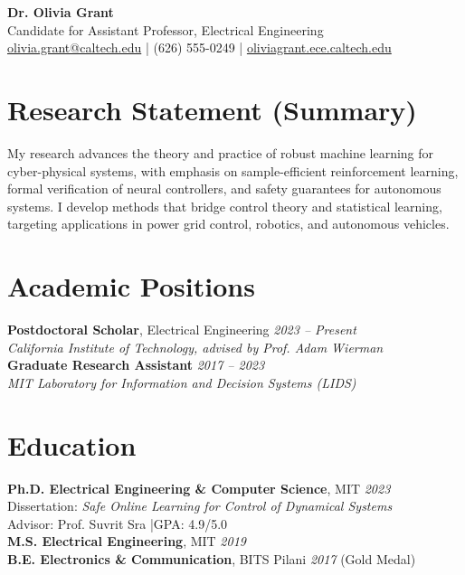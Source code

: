 \documentclass[11pt,a4paper]{article}
\begin{document}
\begin{center}
  {\LARGE \textbf{Dr. Olivia Grant}}\\[4pt]
  Candidate for Assistant Professor, Electrical Engineering\\[3pt]
  \href{mailto:olivia.grant@caltech.edu}{olivia.grant@caltech.edu} \quad|\quad
  (626) 555-0249 \quad|\quad
  \href{https://oliviagrant.ece.caltech.edu}{oliviagrant.ece.caltech.edu}
\end{center}

\section{Research Statement (Summary)}
My research advances the theory and practice of robust machine learning for cyber-physical systems, with emphasis on sample-efficient reinforcement learning, formal verification of neural controllers, and safety guarantees for autonomous systems. I develop methods that bridge control theory and statistical learning, targeting applications in power grid control, robotics, and autonomous vehicles.

\section{Academic Positions}
\noindent\textbf{Postdoctoral Scholar}, Electrical Engineering \hfill \textit{2023 -- Present}\\
\textit{California Institute of Technology, advised by Prof. Adam Wierman}\\[3pt]
\noindent\textbf{Graduate Research Assistant} \hfill \textit{2017 -- 2023}\\
\textit{MIT Laboratory for Information and Decision Systems (LIDS)}

\section{Education}
\textbf{Ph.D. Electrical Engineering \& Computer Science}, MIT \hfill \textit{2023}\\
Dissertation: \textit{Safe Online Learning for Control of Dynamical Systems}\\
Advisor: Prof. Suvrit Sra \quad|\quad GPA: 4.9/5.0\\[3pt]
\textbf{M.S. Electrical Engineering}, MIT \hfill \textit{2019}\\
\textbf{B.E. Electronics \& Communication}, BITS Pilani \hfill \textit{2017} \quad (Gold Medal)
\end{document}

